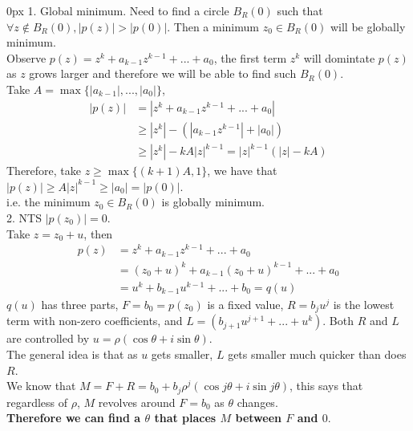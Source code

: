 \documentclass{article}
\begin{document}
\begin{addmargin}[10px]{0px}
    1. Global minimum. Need to find a circle $B_R(0)$ such that $\forall z \notin B_R(0), |p(z)| > |p(0)|$. Then a minimum $z_0 \in B_R(0)$ will be globally minimum.\\
    Observe $p(z) = z^k + a_{k-1}z^{k-1} + ... + a_0$, the first term $z^k$ will domintate $p(z)$ as $z$ grows larger and therefore we will be able to find such $B_R(0)$.\\
    Take $A = \max\{|a_{k-1}|, ..., |a_0|\}$,
    \begin{equation*}
        \begin{split}
            |p(z)| &= |z^k + a_{k-1}z^{k-1} + ... + a_0|\\
            &\geq |z^k| - (|a_{k-1}z^{k-1}| + |a_0|)\\
            &\geq |z^k| - kA|z|^{k-1} = |z|^{k-1}(|z|-kA)
        \end{split}
    \end{equation*}
    Therefore, take $z \geq \max \{(k+1)A, 1\}$, we have that $|p(z)| \geq A |z|^{k-1} \geq |a_0| = |p(0)|$.\\
    i.e. the minimum $z_0 \in B_R(0)$ is globally minimum.\\
    2. NTS $|p(z_0)| = 0$.\\
    Take $z = z_0 + u$, then
    \begin{equation*}
        \begin{split}
            p(z) &= z^k + a_{k-1}z^{k-1} + ... + a_0\\
            &= (z_0 + u)^k + a_{k-1}(z_0+u)^{k-1} + ... + a_0\\
            &= u^k + b_{k-1}u^{k-1} + ... + b_0 = q(u)
        \end{split}
    \end{equation*}
    $q(u)$ has three parts, $F = b_0 = p(z_0)$ is a fixed value, $R = b_ju^j$ is the lowest term with non-zero coefficients, and $L = (b_{j+1}u^{j+1} + ... + u^k)$. Both $R$ and $L$ are controlled by $u = \rho(\cos \theta + i\sin \theta)$.\\
    The general idea is that as $u$ gets smaller, $L$ gets smaller much quicker than does $R$.\\
    We know that $M = F + R = b_0 + b_j\rho^j(\cos j\theta + i\sin j\theta)$, this says that regardless of $\rho$, $M$ revolves around $F = b_0$ as $\theta$ changes.\\
    \textbf{Therefore we can find a $\theta$ that places $M$ between $F$ and $0$}.\\

\end{addmargin}
\end{document}

